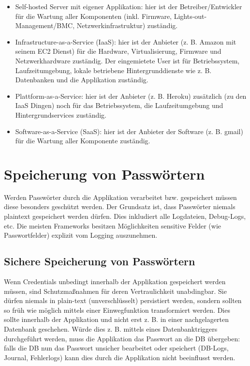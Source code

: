 \begin{itemize}
	\item Self-hosted Server mit eigener Applikation: hier ist der Betreiber/Entwickler für die Wartung aller Komponenten (inkl. Firmware, Lights-out-Management/BMC, Netzwerkinfrastruktur) zuständig.
	\item Infrastructure-as-a-Service (IaaS): hier ist der Anbieter (z. B. Amazon mit seinem EC2 Dienst) für die Hardware, Virtualisierung, Firmware und Netzwerkhardware zuständig. Der eingemietete User ist für Betriebssystem, Laufzeitumgebung, lokale betriebene Hintergrunddienste wie z. B. Datenbanken und die Applikation zuständig.
	\item Plattform-as-a-Service: hier ist der Anbieter (z. B. Heroku) zusätzlich (zu den IaaS Dingen) noch für das Betriebssystem, die Laufzeitumgebung und Hintergrundservices zuständig.
	\item Software-as-a-Service (SaaS): hier ist der Anbieter der Software (z. B. gmail) für die Wartung aller Komponente zuständig.
\end{itemize}

\section{Speicherung von Passwörtern}
\label{password_storage}

Werden Passwörter durch die Applikation verarbeitet bzw. gespeichert müssen diese besonders geschützt werden. Der Grundsatz ist, dass Passwörter niemals plaintext gespeichert werden dürfen. Dies inkludiert alle Logdateien, Debug-Logs, etc. Die meisten Frameworks besitzen Möglichkeiten sensitive Felder (wie Passwortfelder) explizit vom Logging auszunehmen.

\subsection{Sichere Speicherung von Passwörtern}

Wenn Credentials unbedingt innerhalb der Applikation gespeichert werden müssen, sind Schutzmaßnahmen für deren Vertraulichkeit unabdingbar. Sie dürfen niemals in plain-text (unverschlüsselt) persistiert werden, sondern sollten so früh wie möglich mittels einer Einwegfunktion transformiert werden. Dies sollte innerhalb der Applikation und nicht erst z. B. in einer nachgelagerten Datenbank geschehen. Würde dies z. B. mittels eines Datenbanktriggers durchgeführt werden, muss die Applikation das Passwort an die DB übergeben: falls die DB nun das Passwort unsicher bearbeitet oder speichert (DB-Logs, Journal, Fehlerlogs) kann dies durch die Applikation nicht beeinflusst werden.

